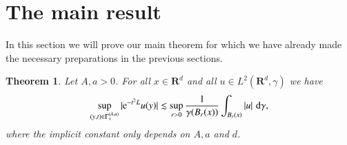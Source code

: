 \documentclass[preprint,12pt]{elsarticle}
\newtheorem{theorem}{Theorem}
\theoremstyle{remark}
\newcommand{\D}{\,\textup{d}}
\newcommand{\LHG}{{L^2(\R^d,\gamma)}}
\newcommand{\R}{\mathbf R}
\newcommand{\e}{\mathrm{e}} %
\begin{document}
\section{The main result}
In this section we will prove our main theorem for which we have already made
the necessary preparations in the previous sections.
\begin{theorem}\label{thm:Gaussian-maximal-function}
  Let $A, a > 0$. For all $x \in \R^d$ and all $u \in \LHG$ we have
  \begin{equation}
    \label{eq:Maximal-function-cone}
    \sup_{(y, t) \in \Gamma_x^{(A, a)}} |\e^{-t^2 L} u(y)| \lesssim
    \sup_{r > 0} \frac1{\gamma(B_r(x))}\int_{B_r(x)} |u| \, \D\gamma,
  \end{equation}
  where the implicit constant only depends on $A, a$ and $d$.
\end{theorem}
\end{document}
